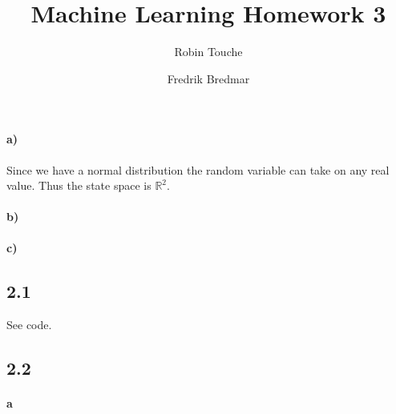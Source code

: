 \documentclass{article}
\author{
  Robin Touche \\
  \and
  Fredrik Bredmar
}
\title{Machine Learning Homework 3}
\begin{document}
\maketitle

\setcounter{section}{1}
\subsection{}
\paragraph{a)}

Since we have a normal distribution the random variable can take on any real
value. Thus the state space is $\mathbb{R}^2$.

\paragraph{b)}


\paragraph{c)}

%
%

\setcounter{section}{2}
\subsection*{2.1}

See code.

\subsection*{2.2}

\paragraph{a}
\end{document}

